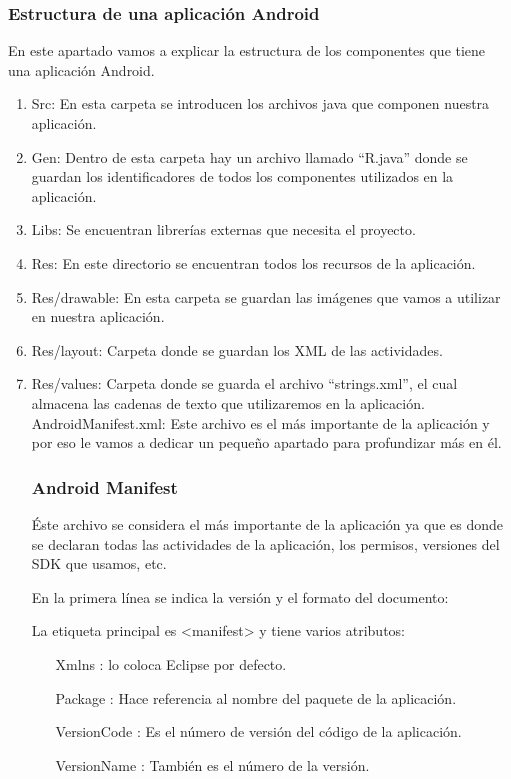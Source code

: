 \subsubsection{Estructura de una aplicación Android}
En este apartado vamos a explicar la estructura de los componentes
 que tiene una aplicación Android.
\begin{enumerate}
\item	Src: En esta carpeta se introducen los archivos java 
que componen nuestra aplicación.
\item	Gen: Dentro de esta carpeta hay un archivo llamado ``R.java'' 
donde se guardan los identificadores de todos los componentes
 utilizados en la aplicación.
\item	Libs: Se encuentran librerías externas que necesita el proyecto.
\item	Res: En este directorio se encuentran todos los recursos
 de la aplicación.
\item	Res/drawable: En esta carpeta se guardan las imágenes 
que vamos a utilizar en nuestra aplicación.
\item	Res/layout: Carpeta donde se guardan los XML de las actividades.
\item	Res/values: Carpeta donde se guarda el archivo ``strings.xml'',
 el cual almacena las cadenas de texto que utilizaremos en la aplicación. 
AndroidManifest.xml: Este archivo es el más importante de la aplicación
 y por eso le vamos a dedicar un pequeño apartado para profundizar más en él.
\subsubsection{Android Manifest}
Éste archivo se considera el más importante de la aplicación ya que es
 donde se declaran todas las actividades de la aplicación, los permisos,
 versiones del SDK que usamos, etc.
 
En la primera línea se indica la versión y el formato del documento:
 
La etiqueta principal es <manifest> y tiene varios atributos:
\begin{enumerate}
\item[Xmlns]: lo coloca Eclipse por defecto.
\item[Package]: Hace referencia al nombre del paquete de la aplicación.
\item[VersionCode]: Es el número de versión del código de la aplicación.
\item[VersionName]: También es el número de la versión.
 \end{enumerate}
 

\end{enumerate}
